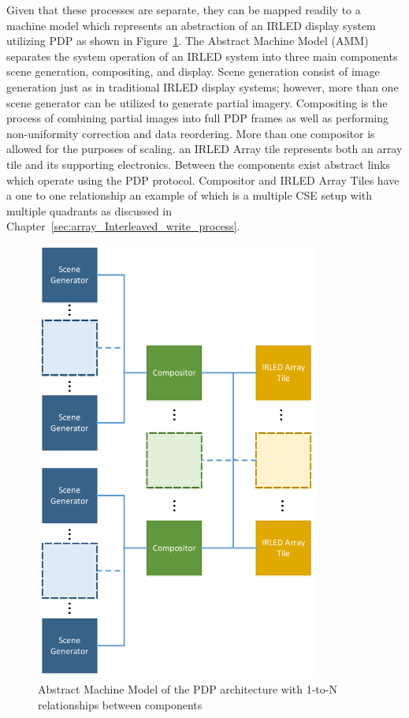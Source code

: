    Given that these processes are separate, they can be mapped readily to a machine model which represents an abstraction of an IRLED display system utilizing PDP as shown in Figure~\ref{fig:amm}. The Abstract Machine Model (AMM) separates the system operation of an IRLED system into three main components scene generation, compositing, and display. Scene generation consist of image generation just as in traditional IRLED display systems; however, more than one scene generator can be utilized to generate partial imagery. Compositing is the process of combining partial images into full PDP frames as well as performing non-uniformity correction and data reordering. More than one compositor is allowed for the purposes of scaling. an IRLED Array tile represents both an array tile and its supporting electronics. Between the components exist abstract links which operate using the PDP protocol. Compositor and IRLED Array Tiles have a one to one relationship an example of which is a multiple CSE setup with multiple quadrants as discussed in Chapter~\ref{sec:array_Interleaved_write_process}.

    \begin{figure}
        \centering
        \includegraphics[width=0.83\textwidth]{fig/amm.pdf}
        \caption{Abstract Machine Model of the PDP architecture with 1-to-N relationships between components}
        \label{fig:amm}
    \end{figure}

